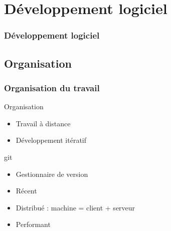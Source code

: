 \section{D\'eveloppement logiciel}

\begin{frame}
 	\frametitle{Développement logiciel}
\end{frame}

\subsection{Organisation}
\frame
{
\frametitle{Organisation du travail}
\begin{block}{Organisation}
 \begin{itemize}
 \item Travail à distance
 \item Développement itératif
 \end{itemize}
\end{block}

\begin{block}{git}
 \begin{itemize}
  \item Gestionnaire de version
\item Récent 
\item Distribué : machine = client + serveur
\item Performant
 \end{itemize}
\end{block}

}

